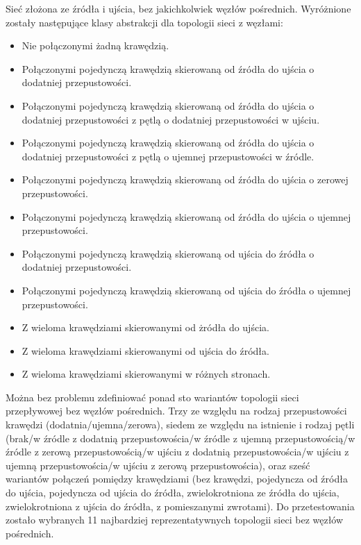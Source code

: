 \documentclass[10pt]{dokument-tiwo}
\begin{document}
Sieć złożona ze źródła i ujścia, bez jakichkolwiek węzłów pośrednich. Wyróżnione zostały następujące klasy abstrakcji dla topologii sieci z węzłami:
\begin{itemize}
    \item Nie połączonymi żadną krawędzią.
    \item Połączonymi pojedynczą krawędzią skierowaną od źródła do ujścia o dodatniej przepustowości.
    \item Połączonymi pojedynczą krawędzią skierowaną od źródła do ujścia o dodatniej przepustowości z pętlą o dodatniej przepustowości w ujściu.
    \item Połączonymi pojedynczą krawędzią skierowaną od źródła do ujścia o dodatniej przepustowości z pętlą o ujemnej przepustowości w źródle.
    \item Połączonymi pojedynczą krawędzią skierowaną od źródła do ujścia o zerowej przepustowości.
    \item Połączonymi pojedynczą krawędzią skierowaną od źródła do ujścia o ujemnej przepustowości.
    \item Połączonymi pojedynczą krawędzią skierowaną od ujścia do źródła o dodatniej przepustowości.
    \item Połączonymi pojedynczą krawędzią skierowaną od ujścia do źródła o ujemnej przepustowości.
    \item Z wieloma krawędziami skierowanymi od żródła do ujścia.
    \item Z wieloma krawędziami skierowanymi od ujścia do źródła.
    \item Z wieloma krawędziami skierowanymi w różnych stronach.
\end{itemize}
Można bez problemu zdefiniować ponad sto wariantów topologii sieci przepływowej bez węzłów pośrednich. Trzy ze względu na rodzaj przepustowości krawędzi (dodatnia/ujemna/zerowa), siedem ze względu na istnienie i rodzaj pętli (brak/w źródle z dodatnią przepustowościa/w źródle z ujemną przepustowością/w źródle z zerową przepustowością/w ujściu z dodatnią przepustowościa/w ujściu z ujemną przepustowościa/w ujściu z zerową przepustowościa), oraz sześć wariantów połączeń pomiędzy krawędziami (bez krawędzi, pojedyncza od źródła do ujścia, pojedyncza od ujścia do źródła, zwielokrotniona ze źródła do ujścia, zwielokrotniona z ujścia do źródła, z pomieszanymi zwrotami). Do przetestowania zostało wybranych 11 najbardziej reprezentatywnych topologii sieci bez węzłów pośrednich.
\end{document}
